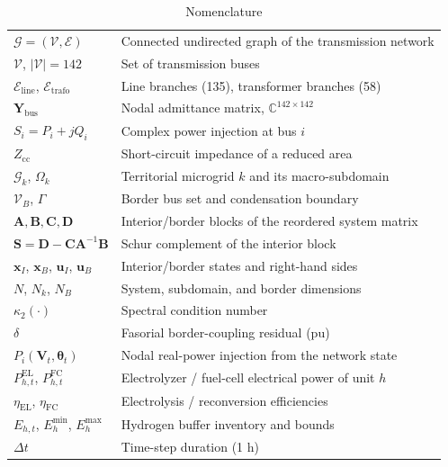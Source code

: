 \begin{table}[!t]
\caption{Nomenclature}
\label{tab:nomenclature}
\centering
\footnotesize
\begin{tabular}{@{}p{} p{}@{}}
\toprule
$\mathcal{G} = (\mathcal{V}, \mathcal{E})$ & Connected undirected graph of the transmission network \\
$\mathcal{V}$, $|\mathcal{V}| = 142$ & Set of transmission buses \\
$\mathcal{E}_{\mathrm{line}}$, $\mathcal{E}_{\mathrm{trafo}}$ & Line branches (135), transformer branches (58) \\
$\mathbf{Y}_{\mathrm{bus}}$ & Nodal admittance matrix, $\mathbb{C}^{142 \times 142}$ \\
$S_i = P_i + j Q_i$ & Complex power injection at bus $i$ \\
$Z_{\mathrm{cc}}$ & Short-circuit impedance of a reduced area \\
$\mathcal{G}_k$, $\Omega_k$ & Territorial microgrid $k$ and its macro-subdomain \\
$\mathcal{V}_B$, $\Gamma$ & Border bus set and condensation boundary \\
$\mathbf{A}, \mathbf{B}, \mathbf{C}, \mathbf{D}$ & Interior/border blocks of the reordered system matrix \\
$\mathbf{S} = \mathbf{D} - \mathbf{C}\mathbf{A}^{-1}\mathbf{B}$ & Schur complement of the interior block \\
$\mathbf{x}_I$, $\mathbf{x}_B$, $\mathbf{u}_I$, $\mathbf{u}_B$ & Interior/border states and right-hand sides \\
$N$, $N_k$, $N_B$ & System, subdomain, and border dimensions \\
$\kappa_2(\cdot)$ & Spectral condition number \\
$\delta$ & Fasorial border-coupling residual (pu) \\
$P_i(\mathbf{V}_t, \boldsymbol{\theta}_t)$ & Nodal real-power injection from the network state \\
$P^{\mathrm{EL}}_{h,t}$, $P^{\mathrm{FC}}_{h,t}$ & Electrolyzer / fuel-cell electrical power of unit $h$ \\
$\eta_{\mathrm{EL}}$, $\eta_{\mathrm{FC}}$ & Electrolysis / reconversion efficiencies \\
$E_{h,t}$, $E_h^{\min}$, $E_h^{\max}$ & Hydrogen buffer inventory and bounds \\
$\Delta t$ & Time-step duration (1 h) \\

\end{tabular}
\end{table}
